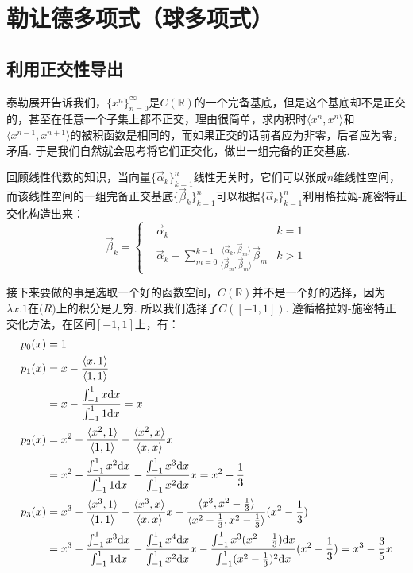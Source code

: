 \documentclass[main.tex]{subfiles}
\begin{document}
\section{勒让德多项式（球多项式）}

\subsection{利用正交性导出}

泰勒展开告诉我们，\(\{x^n\}_{n=0}^{\infty}\)是\(C(\mathbb{R})\)的一个完备基底，但是这个基底却不是正交的，甚至在任意一个子集上都不正交，理由很简单，求内积时\(\langle x^n, x^n \rangle\)和\(\langle x^{n-1}, x^{n+1} \rangle\)的被积函数是相同的，而如果正交的话前者应为非零，后者应为零，矛盾. 于是我们自然就会思考将它们正交化，做出一组完备的正交基底.
\begin{reference}
    回顾线性代数的知识，当向量\(\{\vec{\alpha}_k\}_{k=1}^{n}\)线性无关时，它们可以张成\(n\)维线性空间，而该线性空间的一组完备正交基底\(\{\vec{\beta}_k\}_{k=1}^{n}\)可以根据\(\{\vec{\alpha}_k\}_{k=1}^{n}\)利用格拉姆-施密特正交化构造出来：
    \[
        \vec{\beta}_k = 
        \left\{
            \begin{aligned}
                & \vec{\alpha}_k & k=1 \\
                & \vec{\alpha}_k - \sum_{m=0}^{k-1}\frac{\langle \vec{\alpha}_k, \vec{\beta}_m \rangle}{\langle \vec{\beta}_m, \vec{\beta}_m \rangle}\vec{\beta}_{m} & k > 1
            \end{aligned}
        \right.
    \]
\end{reference}

接下来要做的事是选取一个好的函数空间，\(C(\mathbb{R})\)并不是一个好的选择，因为\(\lambda x.1\)在\(\mathbb(R)\)上的积分是无穷. 所以我们选择了\(C([-1,1])\). 遵循格拉姆-施密特正交化方法，在区间\([-1,1]\)上，有：
\begin{align*}
    p_0(x) &= 1 \\
    p_1(x) &= x-\frac{\langle x, 1 \rangle}{\langle 1,1 \rangle} \\
    &= x - \frac{\int_{-1}^{1} x {\rm d}x}{\int_{-1}^{1} 1{\rm d}x} = x \\
    p_2(x) &= x^2 - \frac{\langle x^2, 1 \rangle}{\langle 1,1 \rangle} - \frac{\langle x^2, x \rangle}{\langle x,x \rangle}x \\
    &= x^2 - \frac{\int_{-1}^{1} x^2 {\rm d}x}{\int_{-1}^{1} 1{\rm d}x} - \frac{\int_{-1}^{1} x^3 {\rm d}x}{\int_{-1}^{1} x^2 {\rm d}x}x = x^2-\frac{1}{3} \\
    p_3(x) &= x^3 - \frac{\langle x^3, 1 \rangle}{\langle 1,1 \rangle} - \frac{\langle x^3, x \rangle}{\langle x,x \rangle}x - \frac{\langle x^3, x^2-\frac{1}{3} \rangle}{\langle x^2-\frac{1}{3},x^2-\frac{1}{3} \rangle}(x^2-\frac{1}{3}) \\
    &= x^3 - \frac{\int_{-1}^{1} x^3 {\rm d}x}{\int_{-1}^{1} 1{\rm d}x} - \frac{\int_{-1}^{1} x^4 {\rm d}x}{\int_{-1}^{1} x^2 {\rm d}x}x - \frac{\int_{-1}^{1} x^3(x^2-\frac{1}{3}) {\rm d}x}{\int_{-1}^{1} (x^2-\frac{1}{3})^2 {\rm d}x}(x^2-\frac{1}{3}) = x^3 - \frac{3}{5}x
\end{align*}
\end{document}
